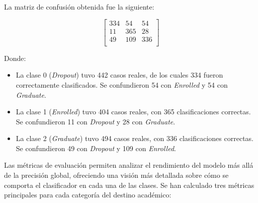 \documentclass{report}[14pt]
\begin{document}
La matriz de confusión obtenida fue la siguiente:

\[
\begin{bmatrix}
334 & 54 & 54 \\
11 & 365 & 28 \\
49 & 109 & 336 \\
\end{bmatrix}
\]

Donde:

\begin{itemize}
  \item La clase 0 (\textit{Dropout}) tuvo 442 casos reales, de los cuales 334 fueron correctamente clasificados. Se confundieron 54 con \textit{Enrolled} y 54 con \textit{Graduate}.
  \item La clase 1 (\textit{Enrolled}) tuvo 404 casos reales, con 365 clasificaciones correctas. Se confundieron 11 con \textit{Dropout} y 28 con \textit{Graduate}.
  \item La clase 2 (\textit{Graduate}) tuvo 494 casos reales, con 336 clasificaciones correctas. Se confundieron 49 con \textit{Dropout} y 109 con \textit{Enrolled}.
\end{itemize}

Las métricas de evaluación permiten analizar el rendimiento del modelo más allá de la precisión global, ofreciendo una visión más detallada sobre cómo se comporta el clasificador en cada una de las clases. Se han calculado tres métricas principales para cada categoría del destino académico:
\end{document}

